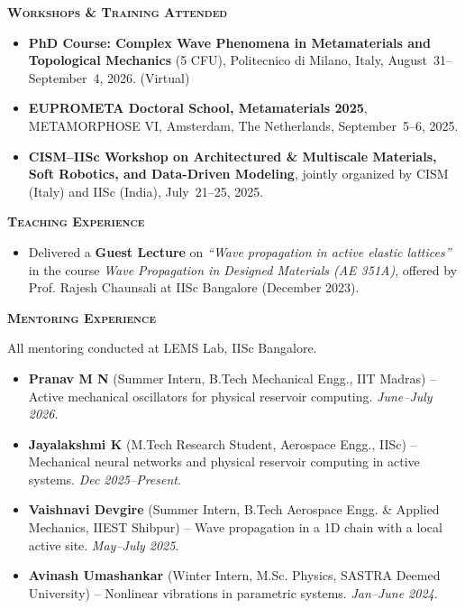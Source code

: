 \documentclass[11pt]{article}
\renewcommand{\section}[1]{%
  \par\vspace{12pt}%
  {\centerline{\large\bfseries\scshape #1}}\par\vspace{-6pt}%
  \noindent{\color{black!20}\rule{\linewidth}{1pt}}\par\vspace{5pt}%
}
\newenvironment{list2}{\begin{itemize}[leftmargin=0.2in,itemsep=0pt,topsep=2pt,parsep=0pt]}{\end{itemize}}
\begin{document}
\section{Workshops \& Training Attended}
\begin{list2}
\item \textbf{PhD Course: Complex Wave Phenomena in Metamaterials and Topological Mechanics} (5 CFU), Politecnico di Milano, Italy, August~31--September~4, 2026. (Virtual)
\vspace{4pt}
\item \textbf{EUPROMETA Doctoral School, Metamaterials 2025}, METAMORPHOSE VI, Amsterdam, The Netherlands, September~5--6, 2025.
\vspace{4pt}
\item \textbf{CISM--IISc Workshop on Architectured \& Multiscale Materials, Soft Robotics, and Data-Driven Modeling}, jointly organized by CISM (Italy) and IISc (India), July~21--25, 2025.
\end{list2}

\section{Teaching Experience}
\begin{list2}
\item Delivered a \textbf{Guest Lecture} on \textit{``Wave propagation in active elastic lattices''} in the course \textit{Wave Propagation in Designed Materials (AE 351A)}, offered by Prof. Rajesh Chaunsali at IISc Bangalore (December 2023).
\end{list2}

\section{Mentoring Experience}
All mentoring conducted at LEMS Lab, IISc Bangalore.
\begin{list2}
\item \textbf{Pranav M N} (Summer Intern, B.Tech Mechanical Engg., IIT Madras) -- Active mechanical oscillators for physical reservoir computing. \textit{June--July 2026}.
\vspace{4pt}
\item \textbf{Jayalakshmi K} (M.Tech Research Student, Aerospace Engg., IISc) -- Mechanical neural networks and physical reservoir computing in active systems. \textit{Dec 2025--Present}.
\vspace{4pt}
\item \textbf{Vaishnavi Devgire} (Summer Intern, B.Tech Aerospace Engg. \& Applied Mechanics, IIEST Shibpur) -- Wave propagation in a 1D chain with a local active site. \textit{May--July 2025}.
\vspace{4pt}
\item \textbf{Avinash Umashankar} (Winter Intern, M.Sc. Physics, SASTRA Deemed University) -- Nonlinear vibrations in parametric systems. \textit{Jan--June 2024}.
\end{list2}
\end{document}
